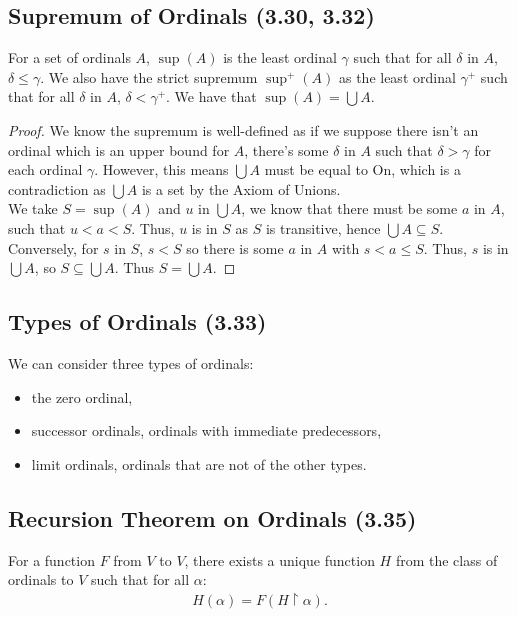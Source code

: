 \subsection{Supremum of Ordinals (3.30, 3.32)} \label{3.30} \label{3.32}

For a set of ordinals $A$, $\sup(A)$ is the least ordinal $\gamma$ 
such that for all $\delta$ in $A$, $\delta \leq \gamma$.
We also have the strict supremum $\sup^+(A)$ as the least ordinal $\gamma^+$
such that for all $\delta$ in $A$, $\delta < \gamma^+$.
We have that $\sup(A) = \bigcup A$.
\begin{proof}
    We know the supremum is well-defined as if we suppose there isn't an 
    ordinal which is an upper bound for $A$, there's some $\delta$ in 
    $A$ such that $\delta > \gamma$ for each ordinal $\gamma$. 
    However, this means $\bigcup A$ must be equal to $\text{On}$, 
    which is a contradiction as $\bigcup A$ is a set by the Axiom of Unions.
    \\[\baselineskip]
    We take $S = \sup(A)$ and $u$ in $\bigcup A$, we know that there must be 
    some $a$ in $A$, such that $u < a < S$. Thus, $u$ is in $S$ as $S$ is transitive, 
    hence $\bigcup A \subseteq S$.
    Conversely, for $s$ in $S$, $s < S$ so there
    is some $a$ in $A$ with $s < a \leq S$. Thus, $s$ is in $\bigcup A$, 
    so $S \subseteq \bigcup A$. Thus $S = \bigcup A$.
\end{proof}

\subsection{Types of Ordinals (3.33)} \label{3.33}

We can consider three types of ordinals: \begin{itemize}
    \item the zero ordinal,
    \item successor ordinals, ordinals with immediate predecessors,
    \item limit ordinals, ordinals that are not of the other types.
\end{itemize}

\subsection{Recursion Theorem on Ordinals (3.35)} \label{3.35}

For a function $F$ from $V$ to $V$, there exists a unique function
$H$ from the class of ordinals to $V$ such that for all $\alpha$: \begin{align*}
    H(\alpha) = F(H \upharpoonright \alpha).
\end{align*}

